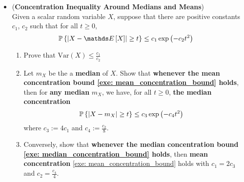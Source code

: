 \documentclass[11pt]{article}
\begin{document}
\begin{itemize}
\item \begin{exercise} (\textbf{Concentration Inequality Around Medians and Means}) \citep{wainwright2019high} \\
Given a scalar random variable $X$, suppose that there are positive constants $c_1$, $c_2$ such that for all $t \ge 0$, 
\begin{align}
\bP\set{\abs{X - \E{}{X}} \ge t} &\le c_1 \exp\paren{- c_2 t^2} \label{exe: mean_concentration_bound}
\end{align}
\begin{enumerate}
\item Prove that $\text{Var}(X) \le \frac{c_1}{c_2}$
\item Let $m_X$ be the a \textbf{median} of $X$. Show that \textbf{whenever the mean concentration bound \eqref{exe: mean_concentration_bound} holds}, then for \textbf{any median} $m_X$, we have, for all $t \ge 0$, \textbf{the median concentration}
\begin{align}
{\mathbb P}\left\{\left\lvert X -  m_X \right\rvert \ge t\right\} &\le c_3 \exp\left(- c_4 t^2\right) \label{exe: median_concentration_bound}
\end{align} where $c_3 := 4c_1$ and $c_4 := \frac{c_2}{8}$. 
\item Conversely, show that \textbf{whenever the median concentration bound \eqref{exe: median_concentration_bound} holds}, then \textbf{mean concentration} \eqref{exe: mean_concentration_bound} holds with $c_1 = 2 c_3$ and $c_2 = \frac{c_4}{4}$.
\end{enumerate}
\end{exercise}
\end{itemize}
\end{document}
